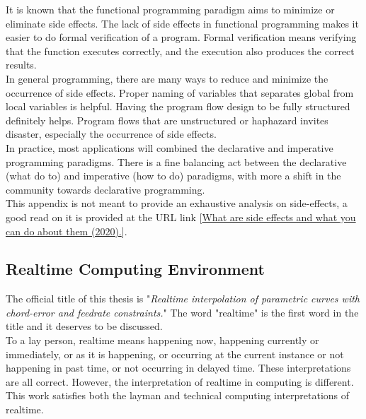 It is known that the functional programming paradigm aims to minimize or eliminate side effects. The lack of side effects in functional programming makes it easier to do formal verification of a program. Formal verification means verifying that the function executes correctly, and the execution also produces the correct results. \\

In general programming, there are many ways to reduce and minimize the occurrence of side effects. Proper naming of variables that separates global from local variables is helpful. Having the program flow design to be fully structured definitely helps. Program flows that are unstructured or haphazard invites disaster, especially the occurrence of side effects. \\

In practice, most applications will combined the declarative and imperative programming paradigms. There is a fine balancing act between the declarative (what do to) and imperative (how to do) paradigms, with more a shift in the community towards declarative programming. \\

This appendix is not meant to provide an exhaustive analysis on side-effects, a good read on it is provided at the URL link [\href{https://thejs.dev/jmitchell/what-are-side-effects-and-what-you-can-do-about-them-jws}{What are side effects and what you can do about them (2020).}]. 




\clearpage
\pagebreak

\subsection{Realtime Computing Environment}
\label{app-chap3-Realtinme Computing Environment}


The official title of this thesis is "\textit{Realtime interpolation of parametric curves with chord-error and feedrate constraints.}" The word "realtime" is the first word in the title and it deserves to be discussed.\\

To a lay person, realtime means happening now, happening currently or immediately, or as it is happening, or occurring at the current instance or not happening in past time, or not occurring in delayed time. These interpretations are all correct. However, the interpretation of realtime in computing is different. This work satisfies both the layman and technical computing interpretations of realtime. \\

